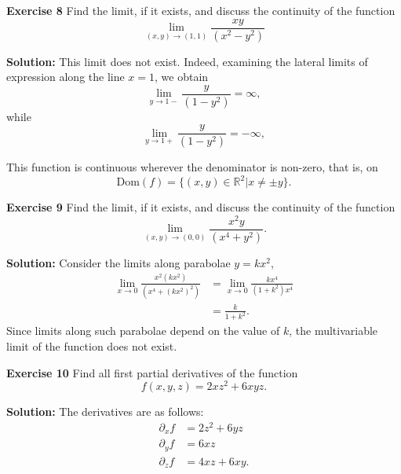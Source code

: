 \documentclass[12pt,oneside]{exam}
\newenvironment{exercise}[1]{\vspace{.1in}\noindent\textbf{Exercise #1 \hspace{.05em}}}{}
\newenvironment{newsolution}{\vspace{.1in}\noindent\textbf{Solution: \hspace{.05em}}}{}
\begin{document}
\begin{exercise}{8}
Find the limit, if it exists, and discuss the continuity of the function
\begin{equation*}
\lim_{(x,y) \to (1,1)} \frac{xy}{(x^2-y^2)}
\end{equation*}
\end{exercise}

\begin{newsolution}
This limit does not exist. Indeed, examining the lateral limits of expression along the line $x=1$, we obtain
\begin{equation*}
\lim_{y \to 1-} \frac{y}{(1-y^2)} = \infty,
\end{equation*}
while
\begin{equation*}
\lim_{y \to 1+} \frac{y}{(1-y^2)} = -\infty,
\end{equation*}

This function is continuous wherever the denominator is non-zero, that is, on
\begin{equation*}
\mathrm{Dom}(f) = \{(x,y) \in \mathbb{R}^2 | x\neq \pm y \}.
\end{equation*}
\end{newsolution}

\begin{exercise}{9}
Find the limit, if it exists, and discuss the continuity of the function
\begin{equation*}
\lim_{(x,y)\to(0,0)} \frac{x^2y}{(x^4+y^2)}.
\end{equation*}
\end{exercise}

\begin{newsolution}
Consider the limits along parabolae $y=kx^2$,
\begin{align*}
\lim_{x \to 0} \frac{x^2(kx^2)}{(x^4+(kx^2)^2)} & = \lim_{x \to 0} \frac{kx^4}{(1+k^2)x^4}\\
& = \frac{k}{1+k^2}. 
\end{align*}
Since limits along such parabolae depend on the value of $k$, the multivariable limit of the function does not exist. 
\end{newsolution}

\begin{exercise}{10} 
Find all first partial derivatives of the function
\begin{equation*}
f(x,y,z) = 2xz^2 + 6xyz.
\end{equation*}
\end{exercise}

\begin{newsolution}
The derivatives are as follows:
\begin{align*}
\partial_{x}f & = 2z^2+6yz \\
\partial_{y}f & = 6xz \\
\partial_{z}f & = 4xz+6xy.
\end{align*}
\end{newsolution}
\end{document}
